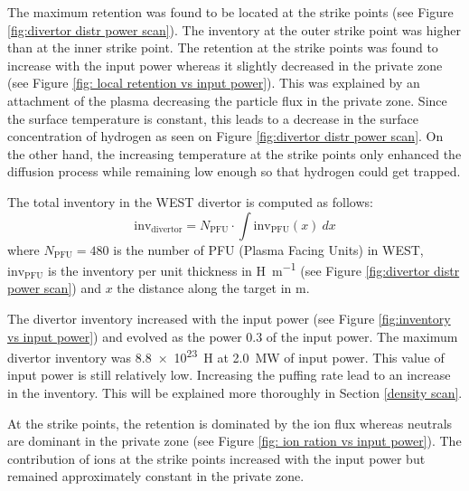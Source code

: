 
The maximum retention was found to be located at the strike points (see Figure \ref{fig:divertor distr power scan}).
The inventory at the outer strike point was higher than at the inner strike point.
The retention at the strike points was found to increase with the input power whereas it slightly decreased in the private zone (see Figure \ref{fig: local retention vs input power}).
This was explained by an attachment of the plasma decreasing the particle flux in the private zone.
Since the surface temperature is constant, this leads to a decrease in the surface concentration of hydrogen as seen on Figure \ref{fig:divertor distr power scan}.
On the other hand, the increasing temperature at the strike points only enhanced the diffusion process while remaining low enough so that hydrogen could get trapped.

The total inventory in the WEST divertor is computed as follows:
\begin{equation}
    \mathrm{inv}_\mathrm{divertor} = N_\mathrm{PFU} \cdot \int \mathrm{inv}_\mathrm{PFU}(x)\: dx
    \label{eq: inventory WEST}
\end{equation}
where $N_\mathrm{PFU} = 480$ is the number of PFU (Plasma Facing Units) in WEST, $\mathrm{inv}_\mathrm{PFU}$ is the inventory per unit thickness in \si{H.m^{-1}} (see Figure \ref{fig:divertor distr power scan}) and $x$ the distance along the target in \si{m}.

The divertor inventory increased with the input power (see Figure \ref{fig:inventory vs input power}) and evolved as the power 0.3 of the input power.
The maximum divertor inventory was \SI{8.8e23}{H} at \SI{2.0}{MW} of input power.
This value of input power is still relatively low.
Increasing the puffing rate lead to an increase in the inventory.
This will be explained more thoroughly in Section \ref{density scan}.

At the strike points, the retention is dominated by the ion flux whereas neutrals are dominant in the private zone (see Figure \ref{fig: ion ration vs input power}).
The contribution of ions at the strike points increased with the input power but remained approximately constant in the private zone.

